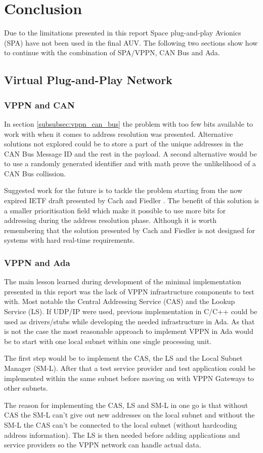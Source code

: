\section{Conclusion}\label{sec:conclusion}
Due to the limitations presented in this report Space plug-and-play Avionics (SPA) have
not been used in the final AUV. The following two sections show how to continue
with the combination of SPA/VPPN, CAN Bus and Ada.

\subsection{Virtual Plug-and-Play Network}
\subsubsection{VPPN and CAN}
In section \ref{subsubsec:vppn_can_bus} the problem with too few bits
available to work with when it comes to address resolution was presented.
Alternative solutions not explored could be to store a part of the unique
addresses in the CAN Bus Message ID and the rest in the payload. A second
alternative would be to use a randomly generated identifier and with math
prove the unlikelihood of a CAN Bus collission.

Suggested work for the future is to tackle the problem starting from the now
expired IETF draft presented by Cach and Fiedler \cite{web:draft-ip_over_can}.
The benefit of this solution is a
smaller prioritisation field which make it possible to use more bits for
addressing during the address resolution phase. Although it is worth remembering
that the solution presented by Cach and Fiedler is not designed for systems
with hard real-time requirements.

\subsubsection{VPPN and Ada}
The main lesson learned during development of the minimal implementation
presented in this report was the lack of VPPN infrastructure
components to test with. Most notable the Central Addressing Service (CAS) and the
Lookup Service (LS). If UDP/IP were used, previous implementation in C/C++ could be
used as drivers/stubs while developing the needed infrastructure in Ada. As
that is not the case the most reasonable approach to implement VPPN in Ada would
be to start with one local subnet within one single processing unit.

The first step would be to implement the CAS, the LS and the Local Subnet Manager (SM-L).
After that a test service provider and test application could be implemented
within the same subnet before moving on with VPPN Gateways to other subnets.

The reason for implementing the CAS, LS and SM-L in one go is
that without CAS the SM-L can't give out new addresses on the local subnet and
without the SM-L the CAS can't be connected to the local subnet (without
hardcoding address information). The LS is then needed before adding
applications and service providers so the VPPN network can handle actual data.
